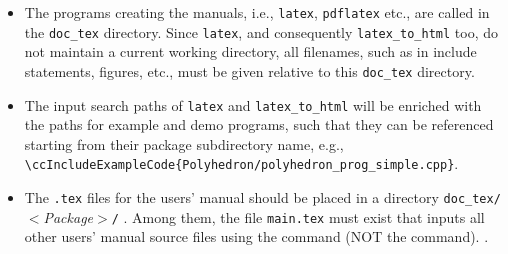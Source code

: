 \begin{itemize}
   \item The programs creating the manuals, i.e., \texttt{latex},
         \texttt{pdflatex} etc.,
         are called in the \texttt{doc\_tex} directory. Since
         \texttt{latex}, and consequently \texttt{latex\_to\_html}
         too, do not maintain a current working directory, all
         filenames, such as in include statements, figures, etc., must
         be given relative to this \texttt{doc\_tex} directory.
   \item The input search paths of \texttt{latex} and
         \texttt{latex\_to\_html} will be enriched with the paths for
         example and demo programs, such that they can be referenced
         starting from their package subdirectory name, e.g.,
         \verb|\ccIncludeExampleCode{Polyhedron/polyhedron_prog_simple.cpp}|.
   \item The {\tt .tex} files for the users' manual%
          should be placed in a
         directory \verb|doc_tex/|$<${\em Package}$>$\verb|/|%
         . Among
         them, the file {\tt main.tex}%
         must exist that inputs all other users'
         manual source files using the \verb|| command (NOT the
         \verb|| command).%
         .


\end{itemize}
